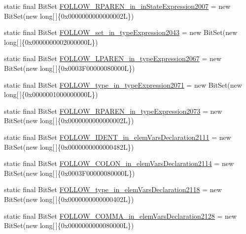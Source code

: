 \begin{DoxyCompactItemize}
\item 
static final Bit\-Set \hyperlink{classorg_1_1tzi_1_1use_1_1parser_1_1ocl_1_1_o_c_l_parser_aaf4e3d4f82bfa48eaa642a50fd358b8c}{F\-O\-L\-L\-O\-W\-\_\-\-R\-P\-A\-R\-E\-N\-\_\-in\-\_\-in\-State\-Expression2007} = new Bit\-Set(new long\mbox{[}$\,$\mbox{]}\{0x0000000000000002\-L\})
\item 
static final Bit\-Set \hyperlink{classorg_1_1tzi_1_1use_1_1parser_1_1ocl_1_1_o_c_l_parser_aaed9fbfbd47a5ee5fa8ea72038d2b8c2}{F\-O\-L\-L\-O\-W\-\_\-set\-\_\-in\-\_\-type\-Expression2043} = new Bit\-Set(new long\mbox{[}$\,$\mbox{]}\{0x0000000002000000\-L\})
\item 
static final Bit\-Set \hyperlink{classorg_1_1tzi_1_1use_1_1parser_1_1ocl_1_1_o_c_l_parser_a200419458ab9ad4e756bf748499f347b}{F\-O\-L\-L\-O\-W\-\_\-\-L\-P\-A\-R\-E\-N\-\_\-in\-\_\-type\-Expression2067} = new Bit\-Set(new long\mbox{[}$\,$\mbox{]}\{0x0003\-F00000080000\-L\})
\item 
static final Bit\-Set \hyperlink{classorg_1_1tzi_1_1use_1_1parser_1_1ocl_1_1_o_c_l_parser_ae503d19471b5e88f2ea3565034bf1b08}{F\-O\-L\-L\-O\-W\-\_\-type\-\_\-in\-\_\-type\-Expression2071} = new Bit\-Set(new long\mbox{[}$\,$\mbox{]}\{0x0000001000000000\-L\})
\item 
static final Bit\-Set \hyperlink{classorg_1_1tzi_1_1use_1_1parser_1_1ocl_1_1_o_c_l_parser_a9263685c3c0fdccc410c0b470a493210}{F\-O\-L\-L\-O\-W\-\_\-\-R\-P\-A\-R\-E\-N\-\_\-in\-\_\-type\-Expression2073} = new Bit\-Set(new long\mbox{[}$\,$\mbox{]}\{0x0000000000000002\-L\})
\item 
static final Bit\-Set \hyperlink{classorg_1_1tzi_1_1use_1_1parser_1_1ocl_1_1_o_c_l_parser_a1216b2e12164ac246c9dee0563c41f0b}{F\-O\-L\-L\-O\-W\-\_\-\-I\-D\-E\-N\-T\-\_\-in\-\_\-elem\-Vars\-Declaration2111} = new Bit\-Set(new long\mbox{[}$\,$\mbox{]}\{0x0000000000000482\-L\})
\item 
static final Bit\-Set \hyperlink{classorg_1_1tzi_1_1use_1_1parser_1_1ocl_1_1_o_c_l_parser_a2e63883b6b0dda90796a8f61c6391257}{F\-O\-L\-L\-O\-W\-\_\-\-C\-O\-L\-O\-N\-\_\-in\-\_\-elem\-Vars\-Declaration2114} = new Bit\-Set(new long\mbox{[}$\,$\mbox{]}\{0x0003\-F00000080000\-L\})
\item 
static final Bit\-Set \hyperlink{classorg_1_1tzi_1_1use_1_1parser_1_1ocl_1_1_o_c_l_parser_a2a91c4bb29416046bde3e93a3c1be438}{F\-O\-L\-L\-O\-W\-\_\-type\-\_\-in\-\_\-elem\-Vars\-Declaration2118} = new Bit\-Set(new long\mbox{[}$\,$\mbox{]}\{0x0000000000000402\-L\})
\item 
static final Bit\-Set \hyperlink{classorg_1_1tzi_1_1use_1_1parser_1_1ocl_1_1_o_c_l_parser_a80c20c70cdcd77d68c2373cc4ad54c9b}{F\-O\-L\-L\-O\-W\-\_\-\-C\-O\-M\-M\-A\-\_\-in\-\_\-elem\-Vars\-Declaration2128} = new Bit\-Set(new long\mbox{[}$\,$\mbox{]}\{0x0000000000080000\-L\})

\end{DoxyCompactItemize}
